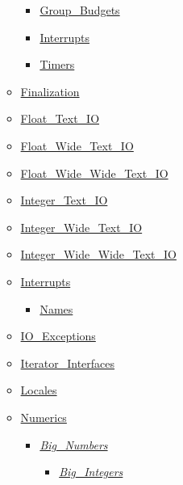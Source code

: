 \begin{multicols*}{\columnnr}
\begin{scriptsize}
\begin{itemize}[leftmargin=0mm]
\begin{itemize}[leftmargin=5mm]
\begin{itemize}[leftmargin=5mm]
	\item[] \href{http://www.ada-auth.org/standards/22rm/html/RM-D-14-2.html}{Group\_Budgets}
	\item[] \href{http://www.ada-auth.org/standards/22rm/html/RM-D-14-3.html}{Interrupts}
	\item[] \href{http://www.ada-auth.org/standards/22rm/html/RM-D-14-1.html}{Timers}
	\end{itemize}
  \item[] \href{http://www.ada-auth.org/standards/22rm/html/RM-7-6.html}{Finalization}
  \item[] \href{http://www.ada-auth.org/standards/22rm/html/RM-A-10-9.html}{Float\_Text\_IO}
  \item[] \href{http://www.ada-auth.org/standards/22rm/html/RM-A-11.html}{Float\_Wide\_Text\_IO}
  \item[] \href{http://www.ada-auth.org/standards/22rm/html/RM-A-11.html}{Float\_Wide\_Wide\_Text\_IO}
  \item[] \href{http://www.ada-auth.org/standards/22rm/html/RM-A-10-8.html}{Integer\_Text\_IO}
  \item[] \href{http://www.ada-auth.org/standards/22rm/html/RM-A-11.html}{Integer\_Wide\_Text\_IO}
  \item[] \href{http://www.ada-auth.org/standards/22rm/html/RM-A-11.html}{Integer\_Wide\_Wide\_Text\_IO}
  \item[] \href{http://www.ada-auth.org/standards/22rm/html/RM-C-3-2.html}{Interrupts}
	\begin{itemize}[leftmargin=5mm]
	\item[] \href{http://www.ada-auth.org/standards/22rm/html/RM-C-3-2.html}{Names}
	\end{itemize}
  \item[] \href{http://www.ada-auth.org/standards/22rm/html/RM-A-13.html}{IO\_Exceptions}
  \item[] \href{http://www.ada-auth.org/standards/22rm/html/RM-5-5-1.html}{Iterator\_Interfaces}
  \item[] \href{http://www.ada-auth.org/standards/22rm/html/RM-A-19.html}{Locales}
  \item[] \href{http://www.ada-auth.org/standards/22rm/html/RM-A-5.html}{Numerics}
	\begin{itemize}[leftmargin=5mm]
	\item[] \href{http://www.ada-auth.org/standards/22rm/html/RM-A-5-5.html}{\textit{Big\_Numbers}}
	  \begin{itemize}[leftmargin=5mm]
	  \item[] \href{http://www.ada-auth.org/standards/22rm/html/RM-A-5-6.html}{\textit{Big\_Integers}}

\end{itemize}
\end{itemize}
\end{itemize}
\end{itemize}
\end{scriptsize}
\end{multicols*}
